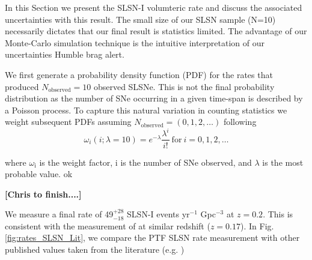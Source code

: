 \documentclass[a4paper,fleqn,usenatbib]{mnras}
\newcommand{\angus}[1]{\color{JungleGreen}#1\color{black}}
\newcommand{\chris}[1]{\color{orange}#1\color{black}}
\newcommand{\comment}[1]{\textbf{[#1]}}
\begin{document}



In this Section we present the SLSN-I volumteric rate and discuss the associated uncertainties with this result. The small size of our SLSN sample (N=10) necessarily dictates that our final result is statistics limited. The advantage of our Monte-Carlo simulation technique is the intuitive interpretation of our uncertainties \angus{Humble brag alert}.

We first generate a probability density function (PDF) for the rates that produced $N_\mathrm{observed}=10$ observed SLSNe. This is not the final probability distribution as the number of SNe occurring in a given time-span is described by a Poisson process. To capture this natural variation in counting statistics we weight subsequent PDFs assuming $N_\mathrm{observed}=(0, 1, 2, \dots)$ following 
\begin{equation}
    \omega_i(i; \lambda=10)=e^{-\lambda }{\frac {\lambda ^{i}}{i!}} \mathrm{~for~} i=0, 1, 2, \dots
\end{equation}

where $\omega_\mathrm{i}$ is the weight factor, i is the number of SNe observed, and $\lambda$ is the most probable value. 
ok

\comment{\chris{Chris to finish....}}


We measure a final rate of 49$^{+28}_{-18}$ SLSN-I events yr$^{-1}$ Gpc$^{-3}$ at $z=0.2$. This is consistent with the measurement of \citep{Quimby2013} at similar redshift ($z=0.17$). In Fig. \ref{fig:rates_SLSN_Lit}, we compare the PTF SLSN rate measurement with other published values taken from the literature (e.g. \citep{Quimby2013,McCrum2015,Prajs2016,Cooke2012}) 
\end{document}

